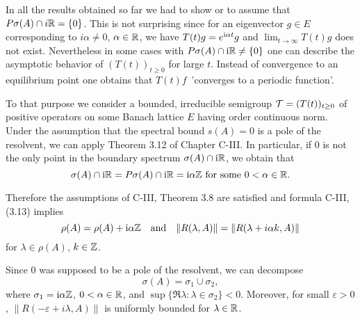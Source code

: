 In all the results obtained so far we had to show or to assume that $P{\sigma}(A) \cap i\mathbb{R} = \{0\}$.
This is not surprising since for an eigenvector $g \in E$ corresponding to $i\alpha \neq 0$, $\alpha \in \mathbb{R}$, we have $T(t)g = e^{\mathrm{i}\alpha t}g$ and $\lim_{t\to\infty} T(t)g$ does not exist.
Nevertheless in some cases with $P{\sigma}(A)\cap \mathrm{i}\mathbb{R} \neq \{0\}$ one can describe the asymptotic behavior of $(T(t))_{t \geq 0}$ for large $t$.
Instead of convergence to an equilibrium point one obtains that $T(t)f$ \,'converges to a periodic function'.

To that purpose we consider a bounded, irreducible semigroup $\mathcal{T} = (T(t))_{t \geq 0}$ of positive operators on some Banach lattice $E$ having order continuous norm.
Under the assumption that the spectral bound $s(A) = 0$ is a pole of the resolvent, we can apply Theorem 3.12 of Chapter C-III.
In particular, if $0$ is not the only point in the boundary spectrum $\sigma(A)\cap \mathrm{i}\mathbb{R}$, we obtain that
\begin{equation*}\label{eq:c4-2.9-kgk}
\sigma(A)\cap \mathrm{i}\mathbb{R} = P{\sigma}(A)\cap \mathrm{i}\mathbb{R} = \mathrm{i}\alpha\mathbb{Z} \text{ for some } 0 < \alpha \in \mathbb{R}.
\end{equation*}


Therefore the assumptions of C-III, Theorem 3.8 are satisfied and formula C-III, (3.13) implies
\begin{equation}\label{eq:c4-2.10}
\rho(A) = \rho(A) + \mathrm{i}\alpha\mathbb{Z} \quad \text{and} \quad \|R(\lambda,A)\| = \|R(\lambda+i\alpha k,A)\|
\end{equation}
for $\lambda \in \rho(A)$, $k \in \mathbb{Z}$.

Since $0$ was supposed to be a pole of the resolvent, we can decompose
\begin{equation*}\label{eq:c4-2.10-kgk}
\sigma(A) = \sigma_{1} \cup \sigma_{2},
\end{equation*}
where $\sigma_{1} = \mathrm{i}\alpha\mathbb{Z}$, $0 < \alpha \in \mathbb{R}$, and $\sup\{\Re\lambda : \lambda \in \sigma_{2}\} < 0$.
Moreover, for small $\varepsilon > 0$, $\|R(-\varepsilon+i\lambda,A)\|$ is uniformly bounded for $\lambda \in \mathbb{R}$.

